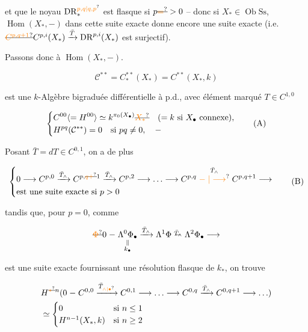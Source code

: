 et que le noyau $\mathrm{DR}^{\unsure{p,q|q,p}}_*$ est flasque si $p\deleted{\unsure{=}}>0$ -- donc si $X_*\in\operatorname{Ob}\mathrm{Ss}$, $\operatorname{Hom}(X_*,-)$ dans cette suite exacte donne encore une suite exacte (i.e. $\deleted{\unsure{C^{p,q+1}}}C^{p,i}(X_*)\xrightarrow{\bar T}\mathrm{DR}^{p,i}(X_*)$ est surjectif).

Passons donc à $\operatorname{Hom}(X_*,-)$.

\[
\mathcal C^{**}=C^{**}_*(X_*)=C^{**}(X_*,k)
\]

est une $k$-Algèbre bigraduée différentielle à p.d., avec élément marqué $T\in C^{1,0}$

\[
\left\{\begin{aligned}
&C^{00}\inserted{=H^{00}}\simeq k^{\pi_0(X_\bullet)}\deleted{\unsure{X_*}}\quad(=k\text{ si }X_\bullet\text{ connexe}),\\
&H^{pq}(\mathcal C^{**})=0\quad\text{si }pq\ne0,\quad\relbar
\end{aligned}\right.\tag*{(A)}
\]

Posant $\bar T=dT\in C^{0,1}$, on a de plus

\[
\left\{\begin{aligned}
&0\longrightarrow C^{p,0}\xrightarrow{\bar T_\wedge}C^{p,\deleted{\unsure{q+}}1}
 \xrightarrow{\bar T_\wedge}C^{p,2}\longrightarrow\ldots
 \longrightarrow C^{p,q}\mathrel{\overset{\bar T_\wedge}{\unsure{\relbar|\longrightarrow}}}C^{p,q+1}\longrightarrow\\
&\text{est une suite exacte si }p>0
\end{aligned}\right.\tag*{(B)}
\]

tandis que, pour $p=0$, comme

\[
\deleted{\unsure{\Phi}}0\relbar\underset{\substack{\Vert\\k_\bullet}}{\Lambda^0\Phi_\bullet}
\xrightarrow{\bar T_\wedge}\Lambda^1\Phi\mathrel{\overset{\bar T_\wedge}{\relbar}}\Lambda^2\Phi_\bullet\longrightarrow
\]

est une suite exacte fournissant une résolution flasque de $k_*$, on trouve

\[
\begin{aligned}
&H^{\deleted{\unsure{*}}n}(0\relbar C^{0,0}\xrightarrow{\bar T_{\unsure{\wedge|\bullet}}}C^{0,1}\longrightarrow\ldots
\longrightarrow C^{0,q}\xrightarrow{\bar T_\wedge}C^{0,q+1}\longrightarrow\ldots)\\
&\simeq\begin{cases}0&\text{si }n\leq1\\ H^{n-1}(X_*,k)&\text{si }n\geq2\end{cases}
\end{aligned}
\]

